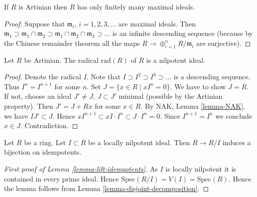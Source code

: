\begin{lemma}
\label{lemma-artinian-finite-nr-max}
If $R$ is Artinian then $R$ has only finitely many maximal ideals.
\end{lemma}

\begin{proof}
Suppose that $\mathfrak m_i$, $i=1,2,3,\ldots$ are maximal ideals.
Then $\mathfrak m_1 \supset \mathfrak m_1\cap \mathfrak m_2
\supset \mathfrak m_1 \cap \mathfrak m_2 \cap \mathfrak m_3 \supset \ldots$
is an infinite descending sequence (because by the Chinese
remainder theorem all the maps $R \to \oplus_{i=1}^n R/\mathfrak m_i$
are surjective).
\end{proof}

\begin{lemma}
\label{lemma-artinian-radical-nilpotent}
Let $R$ be Artinian. The radical $\text{rad}(R)$ of $R$ is
a nilpotent ideal.
\end{lemma}

\begin{proof}
Denote the radical $I$.
Note that $I \supset I^2 \supset I^3 \supset \ldots$ is a descending
sequence. Thus $I^n = I^{n+1}$ for some $n$.
Set $J = \{ x\in R \mid xI^n = 0\}$. We have to show $J = R$.
If not, choose an ideal $J' \not= J$, $J \subset J'$ minimal (possible
by the Artinian property). Then $J' = J + Rx$ for some $x \in R$.
By NAK, Lemma \ref{lemma-NAK}, we have $IJ' \subset J$.
Hence $xI^{n+1} \subset xI \cdot I^n \subset J \cdot I^n = 0$.
Since $I^{n+1}=I^n$ we conclude $x\in J$. Contradiction.
\end{proof}

\begin{lemma}
\label{lemma-lift-idempotents}
Let $R$ be a ring. Let $I \subset R$ be a locally nilpotent ideal.
Then $R \to R/I$ induces a bijection on idempotents.
\end{lemma}

\begin{proof}[First proof of Lemma \ref{lemma-lift-idempotents}]
As $I$ is locally nilpotent it is contained in every prime ideal.
Hence $\text{Spec}(R/I) = V(I) = \text{Spec}(R)$. Hence the
lemma follows from Lemma \ref{lemma-disjoint-decomposition}.
\end{proof}

